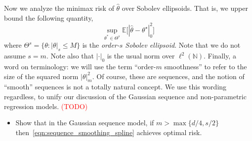 \documentclass{article}
\newcommand{\1}{\mathbf{1}}
\newcommand{\Ebb}{\mathbb{E}}
\newcommand{\wh}[1]{\widehat{#1}}
\theoremstyle{alden}
\theoremstyle{aldenthm}
\theoremstyle{definition}
\theoremstyle{remark}
\begin{document}
Now we analyze the minimax risk of $\wh{\theta}$ over Sobolev ellipsoids. That is, we upper bound the following quantity,
\begin{equation*}
\sup_{\theta^{\ast} \in \Theta^s} \Ebb\bigl[|\wh{\theta} - \theta^{\star}|_{0}^2\bigr]
\end{equation*}
where $\Theta^s = \{\theta: |\theta|_s \leq M\}$ is the \emph{order-$s$ Sobolev ellipsoid}. Note that we do not assume $s = m$. Note also that $|\cdot|_0$ is the usual norm over $\ell^2(\mathbb{N})$. Finally, a word on terminology: we will use the term ``order-$m$ smoothness'' to refer to the size of the squared norm $|\theta|_m^2$. Of course, these are sequences, and the notion of ``smooth'' sequences is not a totally natural concept. We use this wording regardless, to unify our discussion of the Gaussian sequence and non-parametric regression models.
\textcolor{red}{(TODO)}
\begin{itemize}
	\item Show that in the Gaussian sequence model, if $m > \max\{d/4,s/2\}$ then~\eqref{eqn:sequence_smoothing_spline} achieves optimal risk.
\end{itemize}
\end{document}
